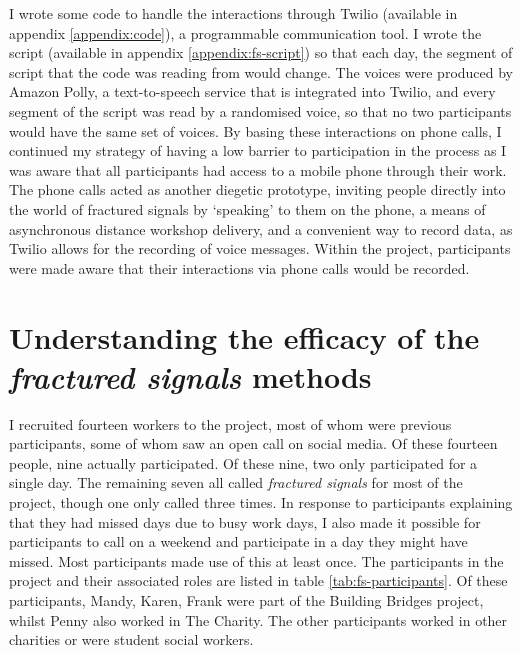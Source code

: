 I wrote some code to handle the interactions through Twilio (available in appendix \ref{appendix:code}), a programmable communication tool. I wrote the script (available in appendix \ref{appendix:fs-script}) so that each day, the segment of script that the code was reading from would change. The voices were produced by Amazon Polly, a text-to-speech service that is integrated into Twilio, and every segment of the script was read by a randomised voice, so that no two participants would have the same set of voices. By basing these interactions on phone calls, I continued my strategy of having a low barrier to participation in the process as I was aware that all participants had access to a mobile phone through their work. The phone calls acted as another diegetic prototype, inviting people directly into the world of fractured signals by `speaking' to them on the phone, a means of asynchronous distance workshop delivery, and a convenient way to record data, as Twilio allows for the recording of voice messages. Within the project, participants were made aware that their interactions via phone calls would be recorded.

\section{Understanding the efficacy of the \textit{fractured signals} methods}
I recruited fourteen workers to the project, most of whom were previous participants, some of whom saw an open call on social media. Of these fourteen people, nine actually participated. Of these nine, two only participated for a single day. The remaining seven all called \textit{fractured signals} for most of the project, though one only called three times. In response to participants explaining that they had missed days due to busy work days, I also made it possible for participants to call on a weekend and participate in a day they might have missed. Most participants made use of this at least once. The participants in the project and their associated roles are listed in table \ref{tab:fs-participants}. Of these participants, Mandy, Karen, Frank were part of the Building Bridges project, whilst Penny also worked in The Charity. The other participants worked in other charities or were student social workers.

